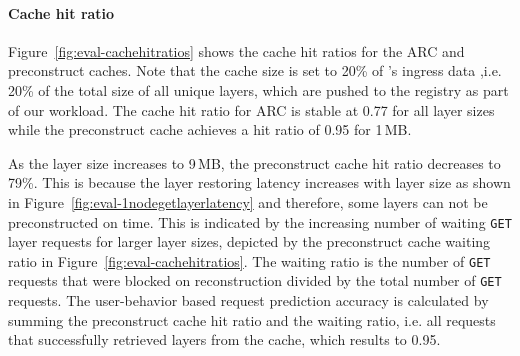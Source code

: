 \paragraph{Cache hit ratio}
%
Figure~\ref{fig:eval-cachehitratios} shows the cache hit ratios for the ARC and
preconstruct caches.
%
Note that the cache size is set to 20\% of \dal{}'s ingress data ,i.e. 20\% of the total size of
all unique layers, which are pushed to the registry as part of our workload.
%
%
%
The cache hit ratio for ARC is stable at 0.77 for all layer sizes while
the preconstruct cache achieves a hit ratio of 0.95 for 1\,MB.

As the layer size increases to 9\,MB, the preconstruct cache hit ratio decreases to 79\%.
%
This is because the layer restoring latency increases with layer size as shown in
Figure~\ref{fig:eval-1nodegetlayerlatency} and therefore, some layers can not be preconstructed
on time.
%
%
This is indicated by the increasing number of waiting \texttt{GET} layer requests for larger layer
sizes, depicted by the preconstruct cache waiting ratio in Figure~\ref{fig:eval-cachehitratios}.
%
The waiting ratio is the number of \texttt{GET} requests that were blocked on reconstruction
divided by the total number of \texttt{GET} requests.
%
%
%
The user-behavior based request prediction accuracy is calculated by summing the preconstruct
cache hit ratio and the waiting ratio, i.e. all requests that successfully retrieved layers from the cache,
which results to 0.95.
%

